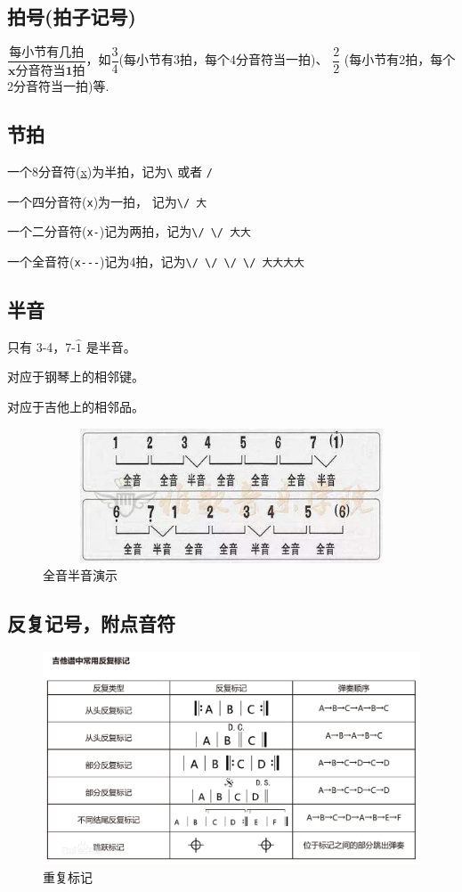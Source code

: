 \documentclass[UTF8,a4paper,12pt]{ctexbook}
\begin{document}
		\subsection*{拍号(拍子记号)}
			$\dfrac{\textbf{每小节有几拍}}{\textbf{x分音符当1拍}} $，如$\dfrac{3}{4} $(每小节有3拍，每个4分音符当一拍)、  $\dfrac{2}{2} $ (每小节有2拍，每个2分音符当一拍)等.
		
		\subsection*{节拍}
			一个8分音符(\underline{x})为半拍，记为\verb|\| 或者 \verb|/|
		
			一个四分音符(\verb|x|)为一拍， 记为\verb|\/ 大|

			一个二分音符(\verb|x-|)记为两拍，记为\verb|\/ \/ 大大|
			
			一个全音符(\verb|x---|)记为4拍，记为\verb|\/ \/ \/ \/ 大大大大|	
			
					
		\subsection*{半音}
			只有 3-4，7-$\hat{1}$ 是半音。
			
			对应于钢琴上的相邻键。
			
			对应于吉他上的相邻品。
			
			\begin{figure}[H]
				\centering
				\includegraphics[width=12cm,height=4cm]{timg.jpg}
				\caption{全音半音演示}
			\end{figure}
			
		\subsection*{反复记号，附点音符}
			\begin{figure}[H]
				\centering
				\includegraphics[scale=0.34]{repeat}
				\caption{重复标记}
			\end{figure}
\end{document}
